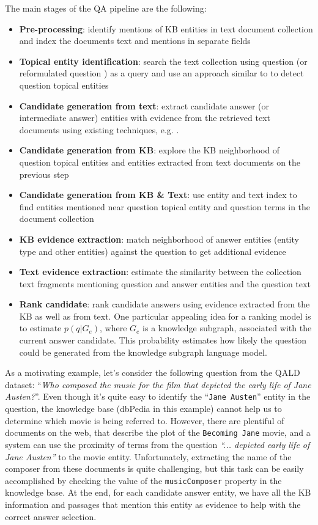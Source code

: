 The main stages of the QA pipeline are the following:
\begin{itemize}
\item \textbf{Pre-processing}: identify mentions of KB entities in text document collection and index the documents text and mentions in separate fields
\item \textbf{Topical entity identification}: search the text collection using question (or reformulated question \cite{AgichteinLG01}) as a query and use an approach similar to \cite{cornolti2014smaph} to detect question topical entities
\item \textbf{Candidate generation from text}: extract candidate answer (or intermediate answer) entities with evidence from the retrieved text documents using existing techniques, e.g. \cite{tsai2015web}.
\item \textbf{Candidate generation from KB}: explore the KB neighborhood of question topical entities and entities extracted from text documents on the previous step
\item \textbf{Candidate generation from KB \& Text}: use entity and text index to find entities mentioned near question topical entity and question terms in the document collection
\item \textbf{KB evidence extraction}: match neighborhood of answer entities (entity type and other entities) against the question to get additional evidence
\item \textbf{Text evidence extraction}: estimate the similarity between the collection text fragments mentioning question and answer entities and the question text
\item \textbf{Rank candidate}: rank candidate answers using evidence extracted from the KB as well as from text. One particular appealing idea for a ranking model is to estimate $p(q|G_e)$, where $G_e$ is a knowledge subgraph, associated with the current answer candidate. This probability estimates how likely the question could be generated from the knowledge subgraph language model.
\end{itemize}

As a motivating example, let's consider the following question from the QALD dataset: ``\textit{Who composed the music for the film that depicted the early life of Jane Austen?}''.
Even though it's quite easy to identify the ``\texttt{Jane Austen}'' entity in the question, the knowledge base (dbPedia in this example) cannot help us to determine which movie is being referred to.
However, there are plentiful of documents on the web, that describe the plot of the \texttt{Becoming Jane} movie, and a system can use the proximity of terms from the question \textit{``... depicted early life of Jane Austen''} to the movie entity.
Unfortunately, extracting the name of the composer from these documents is quite challenging, but this task can be easily accomplished by checking the value of the \texttt{musicComposer} property in the knowledge base.
At the end, for each candidate answer entity, we have all the KB information and passages that mention this entity as evidence to help with the correct answer selection.

